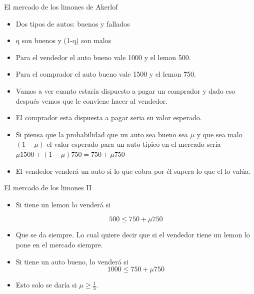 \documentclass{beamer}
\begin{document}
 
\begin{frame}{El mercado de los limones de Akerlof}
    

 


\begin{itemize}
    \item Dos tipos de autos: buenos y fallados
    \item q son buenos y (1-q) son malos 
\item Para el vendedor el auto bueno vale 1000 y el lemon 500. 
\item Para el comprador el auto bueno vale 1500 y el lemon 750. 

\item Vamos a ver cuanto estaría dispuesto a pagar un comprador y dado eso después vemos que le conviene hacer al vendedor. 

\item El comprador esta dispuesta a pagar seria su valor esperado. 

\item Si piensa que la probabilidad que un auto sea bueno sea  $\mu$ y que sea malo  $(1-\mu)$ el valor esperado para un auto típico en el mercado sería  $\mu 1500 + (1-\mu) 750= 750 + \mu 750$ 
\item El vendedor venderá un auto si lo que cobra por él supera lo que el lo valúa. 
\end{itemize}
\end{frame}

\begin{frame}{El mercado de los limones II}
    
\begin{itemize}
\item Si tiene un lemon lo venderá si 

\begin{equation}
    500 \leq 750 + \mu 750
\end{equation}

\item Que se da siempre. Lo cual quiere decir que si el vendedor tiene un lemon lo pone en el mercado siempre.

\item Si tiene un auto bueno, lo venderá si 
\begin{equation}
    1000 \leq 750 + \mu 750 \label{akerlof}
\end{equation}

\item Esto solo se daría si $\mu \geq \frac{1}{3}$. 
\end{itemize}
\end{frame}
\end{document}
